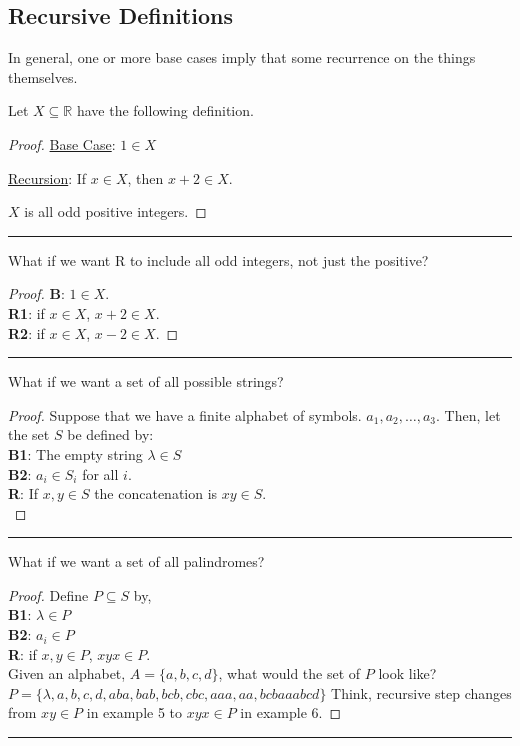 \documentclass{article}
\def \proofDistance {5pt}
\newcommand{\proofseparator}{\par\noindent\rule{\textwidth}{0.4pt}}
\newcommand{\R}{\ensuremath{\mathbb{R}}}
\newcommand{\pf}[1]{
    \vspace{\proofDistance}
    \begin{proof}
    #1
    \end{proof}
    \proofseparator
}
\begin{document}
    \subsection{Recursive Definitions}

        In general, one or more base cases imply that some recurrence on the things themselves. \\

        \begin{example}
            Let $X\subseteq \R$ have the following definition.
        \end{example}

        \pf{
            \item \underline{Base Case}: $1\in X$
            \item \underline{Recursion}: If $x \in X$, then $x + 2 \in X$.
            \item $X$ is all odd positive integers.
        }

        \begin{example}
            What if we want R to include all odd integers, not just the positive?
        \end{example}

        \pf{
            \hfill \break
            \textbf{B}: $1\in X$. \\
            \textbf{R1}: if $x\in X$, $x + 2 \in X$. \\
            \textbf{R2}: if $x\in X$, $x- 2 \in X$.
        }

        \begin{example}
            What if we want a set of all possible strings?
        \end{example}
        
        \pf{
            Suppose that we have a finite alphabet of symbols. $a_1, a_2, \dots, a_3$. Then, let the set $S$ be defined by: \\
            \textbf{B1}: The empty string $\lambda \in S$ \\
            \textbf{B2}: $a_i \in S_i$ for all $i$. \\
            \textbf{R}: If $x,y \in S$ the concatenation is $xy\in S$. \\
        }

        \begin{example}
             What if we want a set of all palindromes?
        \end{example}

        \pf{
            Define $P \subseteq S$ by, \\
            \textbf{B1}: $\lambda \in P$ \\
            \textbf{B2}: $a_i \in P$ \\
            \textbf{R}: if $x,y \in P$, $xyx \in P$. \\
            Given an alphabet, $A = \{a,b,c,d\}$, what would the set of $P$ look like? $P = \{\lambda, a,b,c,d,aba,bab,bcb,cbc,aaa,aa,bcbaaabcd\}$
            Think, recursive step changes from $xy \in P$ in example 5 to $xyx \in P$ in example 6.
        }
\end{document}
